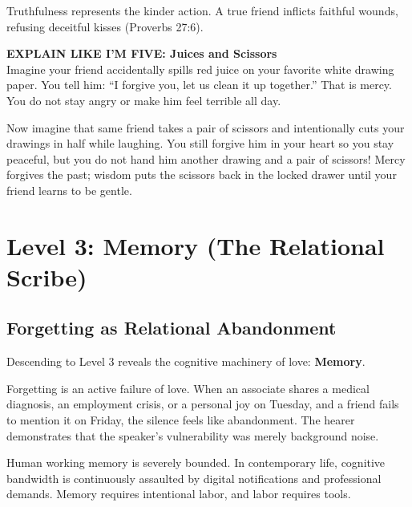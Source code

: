 \documentclass[11pt,twocolumn]{article}
\begin{document}
Truthfulness represents the kinder action. A true friend inflicts faithful wounds, refusing deceitful kisses (Proverbs 27:6).

\begin{eli5box}
\textbf{EXPLAIN LIKE I'M FIVE: Juices and Scissors}\\
Imagine your friend accidentally spills red juice on your favorite white drawing paper. You tell him: ``I forgive you, let us clean it up together.'' That is mercy. You do not stay angry or make him feel terrible all day. 

Now imagine that same friend takes a pair of scissors and intentionally cuts your drawings in half while laughing. You still forgive him in your heart so you stay peaceful, but you do not hand him another drawing and a pair of scissors! Mercy forgives the past; wisdom puts the scissors back in the locked drawer until your friend learns to be gentle.
\end{eli5box}

\section{Level 3: Memory (The Relational Scribe)}

\subsection{Forgetting as Relational Abandonment}
Descending to Level 3 reveals the cognitive machinery of love: \textbf{Memory}.

Forgetting is an active failure of love. When an associate shares a medical diagnosis, an employment crisis, or a personal joy on Tuesday, and a friend fails to mention it on Friday, the silence feels like abandonment. The hearer demonstrates that the speaker's vulnerability was merely background noise.

Human working memory is severely bounded. In contemporary life, cognitive bandwidth is continuously assaulted by digital notifications and professional demands. Memory requires intentional labor, and labor requires tools.
\end{document}
